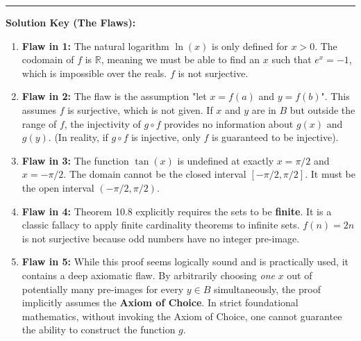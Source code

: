 \documentclass[11pt, a4paper]{article}
\theoremstyle{definition}
\theoremstyle{remark}
\newcommand{\R}{\mathbb{R}}
\begin{document}
\vspace{2em}
\hrule
\vspace{1em}
\textbf{Solution Key (The Flaws):}
\begin{enumerate}
    \item \textbf{Flaw in 1:} The natural logarithm $\ln(x)$ is only defined for $x > 0$. The codomain of $f$ is $\R$, meaning we must be able to find an $x$ such that $e^x = -1$, which is impossible over the reals. $f$ is not surjective.
    \item \textbf{Flaw in 2:} The flaw is the assumption "let $x = f(a)$ and $y = f(b)$". This assumes $f$ is surjective, which is not given. If $x$ and $y$ are in $B$ but outside the range of $f$, the injectivity of $g \circ f$ provides no information about $g(x)$ and $g(y)$. (In reality, if $g \circ f$ is injective, only $f$ is guaranteed to be injective).
    \item \textbf{Flaw in 3:} The function $\tan(x)$ is undefined at exactly $x = \pi/2$ and $x = -\pi/2$. The domain cannot be the closed interval $[-\pi/2, \pi/2]$. It must be the open interval $(-\pi/2, \pi/2)$.
    \item \textbf{Flaw in 4:} Theorem 10.8 explicitly requires the sets to be \textbf{finite}. It is a classic fallacy to apply finite cardinality theorems to infinite sets. $f(n)=2n$ is not surjective because odd numbers have no integer pre-image.
    \item \textbf{Flaw in 5:} While this proof seems logically sound and is practically used, it contains a deep axiomatic flaw. By arbitrarily choosing \textit{one} $x$ out of potentially many pre-images for every $y \in B$ simultaneously, the proof implicitly assumes the \textbf{Axiom of Choice}. In strict foundational mathematics, without invoking the Axiom of Choice, one cannot guarantee the ability to construct the function $g$.
\end{enumerate}
\end{document}

